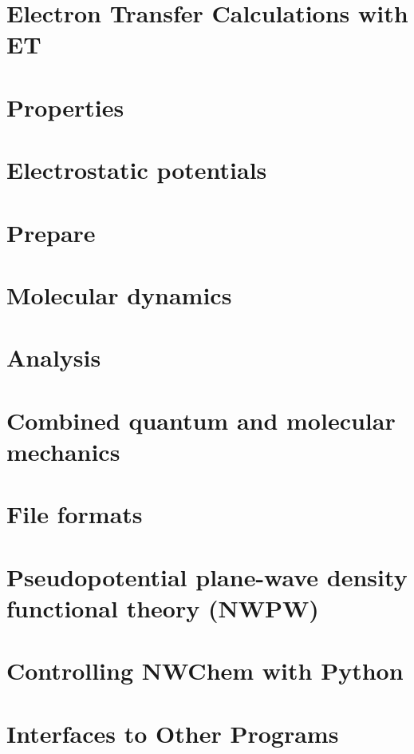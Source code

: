 \chapter{Electron Transfer Calculations with ET}


\chapter{Properties}


\chapter{Electrostatic potentials}


\chapter{Prepare}


\chapter{Molecular dynamics}


\chapter{Analysis}


\chapter{Combined quantum and molecular mechanics}


\chapter{File formats}


\chapter{Pseudopotential plane-wave density functional theory (NWPW)}


\chapter{Controlling NWChem with Python}


\chapter{Interfaces to Other Programs}


